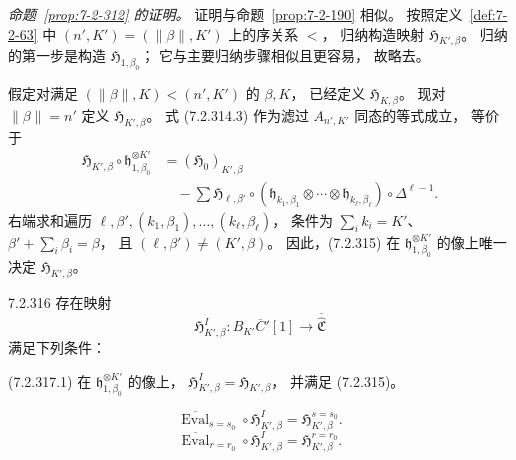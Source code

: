 
\par\noindent\textit{命题~\ref{prop:7-2-312} 的证明。}
证明与命题~\ref{prop:7-2-190} 相似。
按照定义~\ref{def:7-2-63}
中 $(n',K')=(\lVert\beta\rVert,K')$
上的序关系 $<$，
归纳构造映射 $\mathfrak H_{K',\beta}$。
归纳的第一步是构造
$\mathfrak H_{1,\beta_0}$；
它与主要归纳步骤相似且更容易，
故略去。

假定对满足
$(\lVert\beta\rVert,K)<(n',K')$
的 $\beta,K$，
已经定义 $\mathfrak H_{K,\beta}$。
现对 $\lVert\beta\rVert=n'$
定义 $\mathfrak H_{K',\beta}$。
式 (7.2.314.3) 作为滤过
$A_{n',K'}$ 同态的等式成立，
等价于
\begin{equation}
\begin{aligned}
\mathfrak H_{K',\beta}\circ
\mathfrak h_{1,\beta_0}^{\otimes K'}
&=(\mathfrak H_0)_{K',\beta}\\
&\quad-
\sum \mathfrak H_{\ell,\beta'}\circ
(\mathfrak h_{k_1,\beta_1}\otimes\cdots\otimes
\mathfrak h_{k_\ell,\beta_\ell})
\circ\Delta^{\ell-1}.
\end{aligned}
\tag{7.2.315}\label{eq:7-2-315}
\end{equation}
右端求和遍历
$\ell,\beta',(k_1,\beta_1),\ldots,
(k_\ell,\beta_\ell)$，
条件为
$\sum_i k_i=K'$、
$\beta'+\sum_i\beta_i=\beta$，
且 $(\ell,\beta')\ne(K',\beta)$。
因此，(7.2.315) 在
$\mathfrak h_{1,\beta_0}^{\otimes K'}$
的像上唯一决定
$\mathfrak H_{K',\beta}$。

\begin{lemma}{7.2.316}\label{lem:7-2-316}
存在映射
\[
\mathfrak H^I_{K',\beta}\colon
B_{K'}\overline C'[1]
\longrightarrow\overline{\widehat{\mathfrak C}}
\]
满足下列条件：

\par\noindent\textup{(7.2.317.1)}
在 $\mathfrak h_{1,\beta_0}^{\otimes K'}$
的像上，
$\mathfrak H^I_{K',\beta}
=\mathfrak H_{K',\beta}$，
并满足 (7.2.315)。

\begin{equation}
\overline{\operatorname{Eval}}_{s=s_0}
\circ\mathfrak H^I_{K',\beta}
=\mathfrak H^{s=s_0}_{K',\beta}.
\tag{7.2.317.2}\label{eq:7-2-317-2}
\end{equation}
\begin{equation}
\overline{\operatorname{Eval}}_{r=r_0}
\circ\mathfrak H^I_{K',\beta}
=\mathfrak H^{r=r_0}_{K',\beta}.
\tag{7.2.317.3}\label{eq:7-2-317-3}
\end{equation}
\end{lemma}

